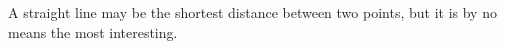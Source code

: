 
%


        
\begin{ntquote}
  A straight line may be the shortest distance between two points, but it is by no means the most interesting.%
\end{ntquote}
